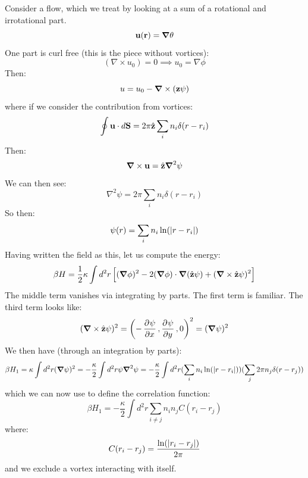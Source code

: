Consider a flow, which we treat by looking at a sum of a rotational and irrotational part.
\begin{equation}
    \v{u}(\v{r}) = \nabla \theta 
\end{equation}
One part is curl free (this is the piece without vortices):
\begin{equation}
    (\nabla \times u_0) = 0 \implies u_0 = \nabla \phi
\end{equation}
Then:
\begin{equation}
    u = u_0 - \nabla \times (\v{z} \psi)
\end{equation}
where if we consider the contribution from vortices:
\begin{equation}
    \oint \mathbf{u} \cdot d\mathbf{S} = 2\pi \hat{\mathbf{z}} \sum_i n_i \delta(r - r_i)
\end{equation}
Then:
\begin{equation}
    \nabla \times \v{u} = \zhat \nabla^2 \psi
\end{equation}
We can then see:
\begin{equation}
    \nabla^2 \psi = 2\pi \sum_i n_i \delta(r - r_i)
\end{equation}
So then:
\begin{equation}
    \psi(r) = \sum_i n_i \ln(\lvert r - r_i \rvert)
\end{equation}
Having written the field as this, let us compute the energy:
\begin{equation}
    \beta H = \frac{1}{2}\kappa \int d^2r \left[(\nabla \phi)^2 - 2(\nabla \phi) \cdot \nabla(\zhat \psi) + (\nabla \times \zhat\psi)^2\right]
\end{equation}
The middle term vanishes via integrating by parts. The first term is familiar. The third term looks like:
\begin{equation}
    (\nabla \times \zhat\psi)^2 = \left(-\dpd{\psi}{x}, \dpd{\psi}{y}, 0\right)^2 = (\nabla \psi)^2
\end{equation}
We then have (through an integration by parts):
\begin{equation}
    \beta H_1 = \kappa \int d^2r (\nabla \psi)^2 = -\frac{\kappa}{2}\int d^2 r \psi \nabla^2 \psi = -\frac{\kappa}{2}\int d^2r (\sum_i n_i \ln(\abs{r - r_i}))(\sum_j 2\pi n_j \delta(r - r_j))
\end{equation}
which we can now use to define the correlation function:
\begin{equation}
    \beta H_1 = -\frac{\kappa}{2}\int d^2r \sum_{i\neq j} n_i n_j C(r_i - r_j)
\end{equation}
where:
\begin{equation}
    C(r_i - r_j) = \frac{\ln(\lvert r_i - r_j \rvert)}{2\pi}
\end{equation}
and we exclude a vortex interacting with itself.

